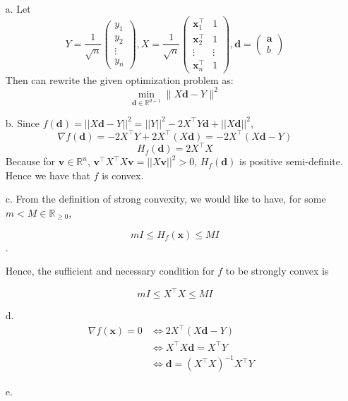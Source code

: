 \documentclass[11pt]{article}
\theoremstyle{remark}
\newcommand{\R}{\mathbb{R}}                     %
\newcommand{\bx}{\mathbf{x}}
\newcommand{\bd}{\mathbf{d}}
\newcommand{\ba}{\mathbf{a}}
\begin{document}
\color{blue}
\begin{itemize}
\item[a.] Let
$$Y=\frac{1}{\sqrt{n}}\begin{pmatrix}
y_1  \\
 y_2 \\
 \vdots \\
 y_n
\end{pmatrix}, X=\frac{1}{\sqrt{n}}\begin{pmatrix}
\bx_1^\intercal & 1  \\
\bx_2^\intercal & 1 \\ 
 \vdots & \vdots \\
\bx_n^\intercal & 1 
\end{pmatrix}, \bd=\begin{pmatrix}
\ba \\
b 
\end{pmatrix}$$
Then can rewrite the given optimization problem as:
 \begin{displaymath}
            \min_{\bd\in\R^{d+1}} \|X\bd-Y\|^2
        \end{displaymath}

\item[b.]
Since $f(\bd)=||X\bd-Y||^2=||Y||^2-2X^\intercal Y\bd + ||X\bd||^2$,
$$\nabla f(\bd)=-2X^\intercal Y+2X^\intercal (X\bd ) = -2X^\intercal(X\bd -Y)$$
$$H_f(\bd) = 2X^\intercal X $$
Because for $\textbf{v} \in \R^n$, $\textbf{v}^\intercal X^\intercal X \textbf{v} = ||X\textbf{v} ||^2 > 0$, $H_f(\bd)$ is positive semi-definite. Hence we have that $f$ is convex.

\item[c.]
From the definition of strong convexity, we would like to have, for some $m < M \in \R_{\geq 0}$,

$$mI \leq H_f(\bx) \leq MI $$.

Hence, the sufficient and necessary condition for $f$ to be strongly convex is

$$mI \leq X^\intercal X \leq MI$$

\item[d.]
\begin{align*}
\nabla f(\bx)=0 &\Leftrightarrow 2X^\intercal (X\bd-Y) &\\
& \Leftrightarrow X^\intercal X \bd = X^\intercal Y &\\
& \Leftrightarrow \bd = (X^\intercal X)^{-1} X^\intercal Y
\end{align*}

\item[e.]


\end{itemize}
\end{document}
